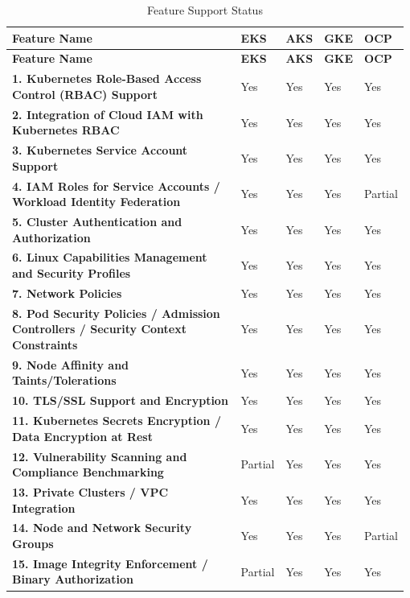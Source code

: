 \begin{longtable}{p{0.74\linewidth} p{0.06\linewidth} p{0.06\linewidth} p{0.06\linewidth} p{0.06\linewidth}}
\caption{Feature Support Status} \label{tab:feature_support} \\

\toprule
\textbf{Feature Name} & \textbf{EKS} & \textbf{AKS} & \textbf{GKE} & \textbf{OCP} \\
\midrule
\endfirsthead

\toprule
\textbf{Feature Name} & \textbf{EKS} & \textbf{AKS} & \textbf{GKE} & \textbf{OCP} \\
\midrule
\endhead

\bottomrule
\endfoot

\endlastfoot
\textbf{1. Kubernetes Role-Based Access Control (RBAC) Support} & Yes &
Yes & Yes & Yes \\
\textbf{2. Integration of Cloud IAM with Kubernetes RBAC} & Yes & Yes &
Yes & Yes \\
\textbf{3. Kubernetes Service Account Support} & Yes & Yes & Yes &
Yes \\
\textbf{4. IAM Roles for Service Accounts / Workload Identity
Federation} & Yes & Yes & Yes & \small{Partial} \\
\textbf{5. Cluster Authentication and Authorization} & Yes & Yes & Yes &
Yes \\
\textbf{6. Linux Capabilities Management and Security Profiles} & Yes &
Yes & Yes & Yes \\
\textbf{7. Network Policies} & Yes & Yes & Yes & Yes \\
\textbf{8. Pod Security Policies / Admission Controllers / Security
Context Constraints} & Yes & Yes & Yes & Yes \\
\textbf{9. Node Affinity and Taints/Tolerations} & Yes & Yes & Yes &
Yes \\
\textbf{10. TLS/SSL Support and Encryption} & Yes & Yes & Yes & Yes \\
\textbf{11. Kubernetes Secrets Encryption / Data Encryption at Rest} &
Yes & Yes & Yes & Yes \\
\textbf{12. Vulnerability Scanning and Compliance Benchmarking} &
\small{Partial} & Yes & Yes & Yes \\
\textbf{13. Private Clusters / VPC Integration} & Yes & Yes & Yes &
Yes \\
\textbf{14. Node and Network Security Groups} & Yes & Yes & Yes &
\small{Partial} \\
\textbf{15. Image Integrity Enforcement / Binary Authorization} &
\small{Partial} & Yes & Yes & Yes \\

\end{longtable}
